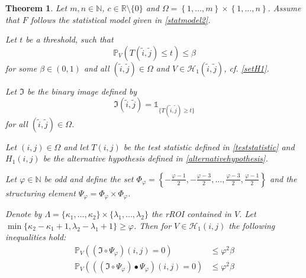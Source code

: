 \documentclass[a4paper,12pt]{article}
\theoremstyle{plain}
\newtheorem{theorem}{Theorem}[section]
\theoremstyle{definition}
\begin{document}
\begin{theorem}\label{thm: typeIIinequalities}
	Let $m, n \in \mathbb{N}$, $c \in \mathbb{R} \setminus \{ 0 \}$ and $\Omega = \left\{ 1, \dots, m \right\} \times \left\{ 1, \dots, n \right\}$. Assume that $F$ follows the statistical model given in \eqref{statmodel2}.
	
	Let $t$ be a threshold, such that
	\begin{equation*}
		\mathbb{P}_V\left( T(\tilde{i}, \tilde{j}) \leq t \right) \leq \beta
	\end{equation*}
	for some $\beta \in (0, 1)$ and all $(\tilde{i}, \tilde{j}) \in \Omega$ and $V \in \mathcal{H}_1(\tilde{i}, \tilde{j})$, cf. \eqref{setH1}.
	
	Let $\mathfrak{I}$ be the binary image defined by
	\begin{equation*}
		\mathfrak{I}(\tilde{i}, \tilde{j}) = \mathds{1}_{ \{ T(\tilde{i}, \tilde{j}) \geq t \} }
	\end{equation*}
	for all $(\tilde{i}, \tilde{j}) \in \Omega$.
	
	Let $(i, j) \in \Omega$ and let $T(i, j)$ be the test statistic defined in \eqref{teststatistic} and $H_1(i, j)$ be the alternative hypothesis defined in \eqref{alternativehypothesis}.
	
	Let $\varphi \in \mathbb{N}$ be odd and define the set $\Phi_\varphi = \left\{ -\frac{\varphi - 1}{2}, -\frac{\varphi - 3}{2}, \dots, \frac{\varphi - 3}{2}, \frac{\varphi - 1}{2} \right\}$ and the structuring element $\Psi_\varphi = \Phi_\varphi \times \Phi_\varphi$.
	
	Denote by $\varLambda = \{ \kappa_1, \dots, \kappa_2 \} \times \{ \lambda_1, \dots, \lambda_2 \}$ the rROI contained in $V$. Let $\min \{ \kappa_2 - \kappa_1 + 1, \lambda_2 - \lambda_1 + 1 \} \geq \varphi$.
	Then for $V \in \mathcal{H}_1(i, j)$ the following inequalities hold:
	\begin{align}
		\mathbb{P}_V\left( (\mathfrak{I} \circ \Psi_\varphi)(i, j) = 0 \right) &\leq \varphi^2 \beta \label{ineq: typeIIopening} \\
		\mathbb{P}_V\left( ((\mathfrak{I} \circ \Psi_\varphi) \bullet \Psi_\varphi)(i, j) = 0 \right) &\leq \varphi^2 \beta \label{ineq: typeIIclosing}
	\end{align}
\end{theorem}
\end{document}
